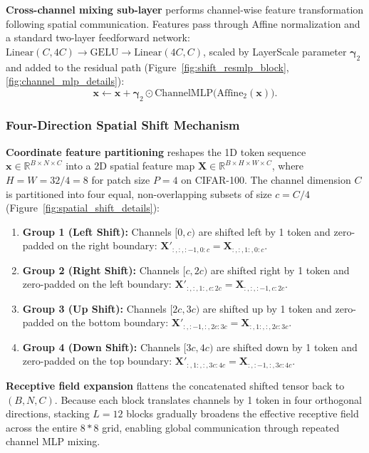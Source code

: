 \textbf{Cross-channel mixing sub-layer} performs channel-wise feature transformation following spatial communication. Features pass through Affine normalization and a standard two-layer feedforward network: $\text{Linear}(C, 4C) \rightarrow \text{GELU} \rightarrow \text{Linear}(4C, C)$, scaled by LayerScale parameter $\boldsymbol{\gamma}_2$ and added to the residual path (Figure~\ref{fig:shift_resmlp_block}, \ref{fig:channel_mlp_details}):
\begin{equation}
\mathbf{x} \leftarrow \mathbf{x} + \boldsymbol{\gamma}_2 \odot \text{ChannelMLP}\big(\text{Affine}_2(\mathbf{x})\big).
\end{equation}

\subsubsection{Four-Direction Spatial Shift Mechanism}
\label{subsubsection:shift_mechanism}

\textbf{Coordinate feature partitioning} reshapes the 1D token sequence $\mathbf{x} \in \mathbb{R}^{B \times N \times C}$ into a 2D spatial feature map $\mathbf{X} \in \mathbb{R}^{B \times H \times W \times C}$, where $H = W = 32 / 4 = 8$ for patch size $P = 4$ on CIFAR-100. The channel dimension $C$ is partitioned into four equal, non-overlapping subsets of size $c = C / 4$ (Figure~\ref{fig:spatial_shift_details}):
\begin{enumerate}
    \item \textbf{Group 1 (Left Shift):} Channels $[0, c)$ are shifted left by 1 token and zero-padded on the right boundary:
      $\mathbf{X}'_{:, :, :-1, 0:c} = \mathbf{X}_{:, :, 1:, 0:c}$.
    \item \textbf{Group 2 (Right Shift):} Channels $[c, 2c)$ are shifted right by 1 token and zero-padded on the left boundary:
      $\mathbf{X}'_{:, :, 1:, c:2c} = \mathbf{X}_{:, :, :-1, c:2c}$.
    \item \textbf{Group 3 (Up Shift):} Channels $[2c, 3c)$ are shifted up by 1 token and zero-padded on the bottom boundary:
      $\mathbf{X}'_{:, :-1, :, 2c:3c} = \mathbf{X}_{:, 1:, :, 2c:3c}$.
    \item \textbf{Group 4 (Down Shift):} Channels $[3c, 4c)$ are shifted down by 1 token and zero-padded on the top boundary:
      $\mathbf{X}'_{:, 1:, :, 3c:4c} = \mathbf{X}_{:, :-1, :, 3c:4c}$.
\end{enumerate}

\textbf{Receptive field expansion} flattens the concatenated shifted tensor back to $(B, N, C)$. Because each block translates channels by 1 token in four orthogonal directions, stacking $L = 12$ blocks gradually broadens the effective receptive field across the entire $8*8$ grid, enabling global communication through repeated channel MLP mixing.

